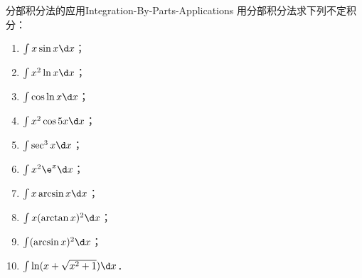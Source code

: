 \begin{problem}{分部积分法的应用}{Integration-By-Parts-Applications}
    用分部积分法求下列不定积分：
    \begin{enumerate}
        \item $\int x \sin x \d x$；
        \item $\int x^2 \ln x \d x$；
        \item $\int \cos \ln x \d x$；
        \item $\int x^2 \cos 5x \d x$；
        \item $\int \sec^3 x \d x$；
        \item $\int x^2 \e^x \d x$；
        \item $\int x \arcsin x \d x$；
        \item $\int x(\arctan x)^2 \d x$；
        \item $\int (\arcsin x)^2 \d x$；
        \item $\int \ln(x + \sqrt{x^2 + 1}) \d x$．
    \end{enumerate}
\end{problem}

